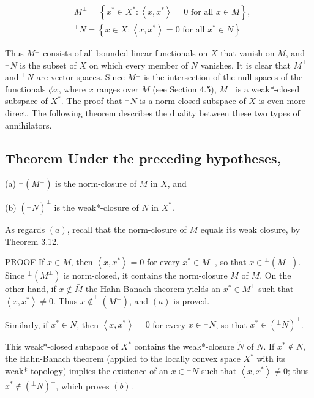 \documentclass[10pt]{article}
\begin{document}
$$
\begin{aligned}
& M^{\perp}=\left\{x^{*} \in X^{*}:\left\langle x, x^{*}\right\rangle=0 \text { for all } x \in M\right\}, \\
& { }^{\perp} N=\left\{x \in X:\left\langle x, x^{*}\right\rangle=0 \text { for all } x^{*} \in N\right\}
\end{aligned}
$$

Thus $M^{\perp}$ consists of all bounded linear functionals on $X$ that vanish on $M$, and ${ }^{\perp} N$ is the subset of $X$ on which every member of $N$ vanishes. It is clear that $M^{\perp}$ and ${ }^{\perp} N$
are vector spaces. Since $M^{\perp}$ is the intersection of the null spaces of the functionals $\phi x$, where $x$ ranges over $M$ (see Section 4.5), $M^{\perp}$ is a weak*-closed subspace of $X^{*}$. The proof that ${ }^{\perp} N$ is a norm-closed subspace of $X$ is even more direct. The following theorem describes the duality between these two types of annihilators.

\subsection{Theorem Under the preceding hypotheses,}
(a) ${ }^{\perp}\left(M^{\perp}\right)$ is the norm-closure of $M$ in $X$, and

(b) $\left({ }^{\perp} N\right)^{\perp}$ is the weak*-closure of $N$ in $X^{*}$.

As regards $(a)$, recall that the norm-closure of $M$ equals its weak closure, by Theorem 3.12.

PROOF If $x \in M$, then $\left\langle x, x^{*}\right\rangle=0$ for every $x^{*} \in M^{\perp}$, so that $x \in{ }^{\perp}\left(M^{\perp}\right)$. Since ${ }^{\perp}\left(M^{\perp}\right)$ is norm-closed, it contains the norm-closure $\bar{M}$ of $M$. On the other hand, if $x \notin \bar{M}$ the Hahn-Banach theorem yields an $x^{*} \in M^{\perp}$ such that $\left\langle x, x^{*}\right\rangle \neq 0$. Thus $x \notin^{\perp}\left(M^{\perp}\right)$, and $(a)$ is proved.

Similarly, if $x^{*} \in N$, then $\left\langle x, x^{*}\right\rangle=0$ for every $x \in{ }^{\perp} N$, so that $x^{*} \in\left({ }^{\perp} N\right)^{\perp}$.

This weak*-closed subspace of $X^{*}$ contains the weak*-closure $\tilde{N}$ of $N$. If $x^{*} \notin \tilde{N}$, the Hahn-Banach theorem (applied to the locally convex space $X^{*}$ with its weak*-topology) implies the existence of an $x \in{ }^{\perp} N$ such that $\left\langle x, x^{*}\right\rangle \neq 0$; thus $x^{*} \notin\left({ }^{\perp} N\right)^{\perp}$, which proves $(b)$.
\end{document}

